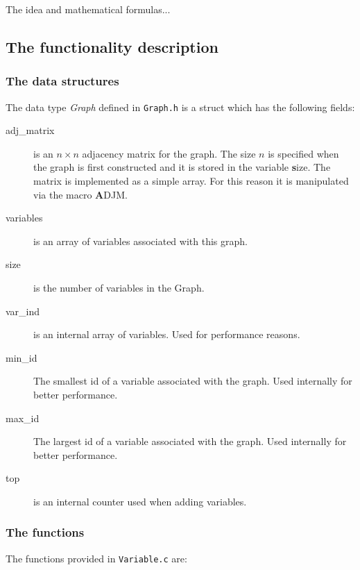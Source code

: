 \documentclass[12pt,a4paper]{report}
\begin{document}
The idea and mathematical formulas...


\subsection{The functionality description}
\subsubsection{The data structures}
The data type {\it Graph} defined in \verb+Graph.h+ is a struct which has the following fields:
\begin{description}
\item[adj\_matrix] is an $n\times n$ adjacency matrix for the graph. The size $n$ is specified when the graph is first constructed and it is stored in the variable {\textbf size}. The matrix is implemented as a simple array. For this reason it is manipulated via the macro {\textbf ADJM}.
\item[variables] is an array of variables associated with this graph.
\item[size] is the number of variables in the Graph.
\item[var\_ind] is an internal array of variables. Used for
performance reasons.
\item[min\_id] The smallest id of a variable associated with the graph. Used internally for better performance.
\item[max\_id] The largest id of a variable associated with the graph. Used internally for better performance.
\item[top] is an internal counter used when adding variables. 
\end{description}


\subsubsection{The functions}

The functions provided in \verb+Variable.c+ are:
\end{document}

